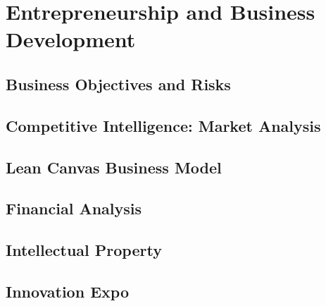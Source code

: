 \part{Entrepreneurship and Business Development}

\chapter{Business Objectives and Risks}

\chapter{Competitive Intelligence: Market Analysis}

\chapter{Lean Canvas Business Model}

\chapter{Financial Analysis}

\chapter{Intellectual Property}

\chapter{Innovation Expo}
